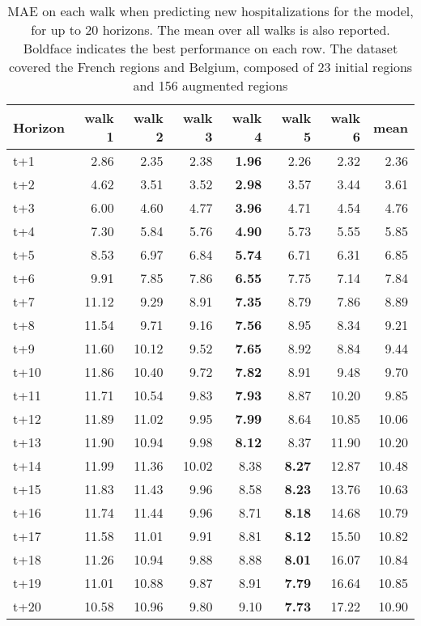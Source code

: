 \begin{table}[H]
\centering
\caption{MAE on each walk when predicting new hospitalizations for the model, for up to 20 horizons. The mean over all walks is also reported. Boldface indicates the best performance on each row. The dataset covered the French regions and Belgium, composed of 23 initial regions and 156 augmented regions }
\label{tab:MAE_walk_dense_model}
\begin{tabular}{lrrrrrrr}
\toprule
Horizon &  walk 1 &  walk 2 &  walk 3 &  walk 4 &  walk 5 &  walk 6 &  mean \\
\midrule
t+1  & 2.86  & 2.35  & 2.38  & \textbf{1.96}  & 2.26  & 2.32  & 2.36  \\
t+2  & 4.62  & 3.51  & 3.52  & \textbf{2.98}  & 3.57  & 3.44  & 3.61  \\
t+3  & 6.00  & 4.60  & 4.77  & \textbf{3.96}  & 4.71  & 4.54  & 4.76  \\
t+4  & 7.30  & 5.84  & 5.76  & \textbf{4.90}  & 5.73  & 5.55  & 5.85  \\
t+5  & 8.53  & 6.97  & 6.84  & \textbf{5.74}  & 6.71  & 6.31  & 6.85  \\
t+6  & 9.91  & 7.85  & 7.86  & \textbf{6.55}  & 7.75  & 7.14  & 7.84  \\
t+7  & 11.12  & 9.29  & 8.91  & \textbf{7.35}  & 8.79  & 7.86  & 8.89  \\
t+8  & 11.54  & 9.71  & 9.16  & \textbf{7.56}  & 8.95  & 8.34  & 9.21  \\
t+9  & 11.60  & 10.12  & 9.52  & \textbf{7.65}  & 8.92  & 8.84  & 9.44  \\
t+10  & 11.86  & 10.40  & 9.72  & \textbf{7.82}  & 8.91  & 9.48  & 9.70  \\
t+11  & 11.71  & 10.54  & 9.83  & \textbf{7.93}  & 8.87  & 10.20  & 9.85  \\
t+12  & 11.89  & 11.02  & 9.95  & \textbf{7.99}  & 8.64  & 10.85  & 10.06  \\
t+13  & 11.90  & 10.94  & 9.98  & \textbf{8.12}  & 8.37  & 11.90  & 10.20  \\
t+14  & 11.99  & 11.36  & 10.02  & 8.38  & \textbf{8.27}  & 12.87  & 10.48  \\
t+15  & 11.83  & 11.43  & 9.96  & 8.58  & \textbf{8.23}  & 13.76  & 10.63  \\
t+16  & 11.74  & 11.44  & 9.96  & 8.71  & \textbf{8.18}  & 14.68  & 10.79  \\
t+17  & 11.58  & 11.01  & 9.91  & 8.81  & \textbf{8.12}  & 15.50  & 10.82  \\
t+18  & 11.26  & 10.94  & 9.88  & 8.88  & \textbf{8.01}  & 16.07  & 10.84  \\
t+19  & 11.01  & 10.88  & 9.87  & 8.91  & \textbf{7.79}  & 16.64  & 10.85  \\
t+20  & 10.58  & 10.96  & 9.80  & 9.10  & \textbf{7.73}  & 17.22  & 10.90  \\

\bottomrule
\end{tabular}
\end{table}
